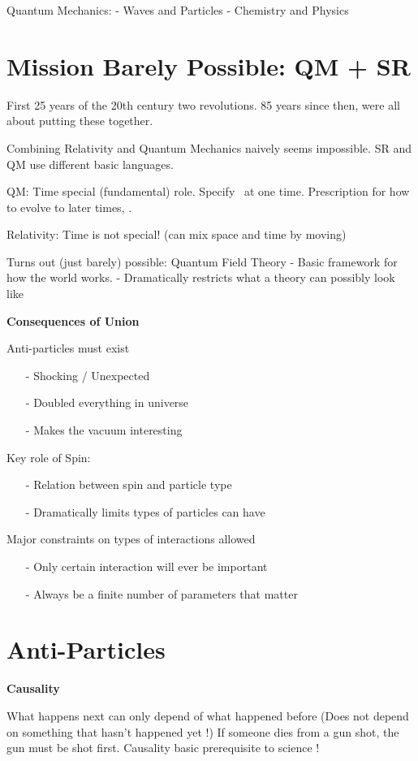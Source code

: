 Quantum Mechanics:
- Waves and Particles
- Chemistry and Physics

\section{Mission Barely Possible: QM + SR}
First 25 years of the 20th century two revolutions.
85 years since then, were all about putting these together.

Combining Relativity and Quantum Mechanics naively seems impossible. 
SR and QM use different basic languages. 

QM: Time special (fundamental) role. Specify \ketY\ at one time. Prescription for how to evolve to later times,
.

Relativity: Time is not special! (can mix space and time by moving)

Turns out (just barely) possible: Quantum Field Theory 
- Basic framework for how the world works.
- Dramatically restricts what a theory can possibly look like


\textbf{Consequences of Union}

Anti-particles must exist
\begin{itemize}
\item[-] Shocking / Unexpected
\item[-] Doubled everything in universe 
\item[-] Makes the vacuum interesting
\end{itemize}

Key role of Spin:
\begin{itemize}
\item[-] Relation between spin and particle type
\item[-] Dramatically limits types of particles can have
\end{itemize}

Major constraints on types of interactions allowed
\begin{itemize}
\item[-] Only certain interaction will ever be important
\item[-] Always be a finite number of parameters that matter
\end{itemize}

\section{Anti-Particles}
\textbf{Causality}

What happens next can only depend of what happened before
(Does not depend on something that hasn't happened yet !)
If someone dies from a gun shot, the gun must be shot first.
Causality basic prerequisite to science !

